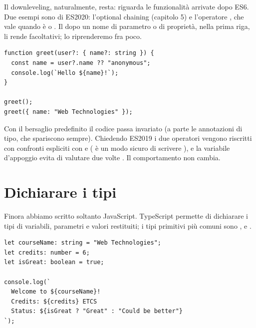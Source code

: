 Il downleveling, naturalmente, resta: riguarda le funzionalità arrivate dopo
ES6. Due esempi sono di ES2020: l'optional chaining  (capitolo 5) e
l'operatore , che vale  quando  è  o
. Il  dopo un nome di parametro o di proprietà, nella
prima riga, li rende facoltativi; lo riprenderemo fra poco.

\begin{lstlisting}[style=ts, name=down.ts]
function greet(user?: { name?: string }) {
  const name = user?.name ?? "anonymous";
  console.log(`Hello ${name}!`);
}

greet();
greet({ name: "Web Technologies" });
\end{lstlisting}


Con il bersaglio predefinito il codice passa invariato (a parte le annotazioni
di tipo, che spariscono sempre). Chiedendo ES2019 i due operatori vengono
riscritti con confronti espliciti con  e 
( è un modo sicuro di scrivere ), e la variabile
d'appoggio  evita di valutare due volte . Il
comportamento non cambia.

\section{Dichiarare i tipi}

Finora abbiamo scritto soltanto JavaScript. TypeScript permette di dichiarare i
tipi di variabili, parametri e valori restituiti; i tipi primitivi più comuni
sono ,  e .

\begin{lstlisting}[style=ts, name=primitive_types.ts]
let courseName: string = "Web Technologies";
let credits: number = 6;
let isGreat: boolean = true;

console.log(`
  Welcome to ${courseName}!
  Credits: ${credits} ETCS
  Status: ${isGreat ? "Great" : "Could be better"}
`);
\end{lstlisting}

